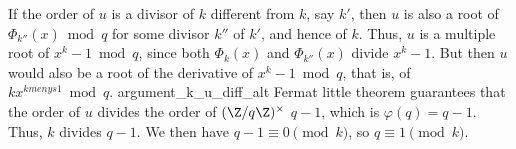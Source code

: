 If the order of ${u}$ is a divisor of ${k}$ different from ${k}$, say $k'$, then ${u}$ is also a root of $\Phi_{k''}(x) \bmod{q}$ for some divisor $k''$ of $k'$, and hence of ${k}$. Thus, ${u}$ is a multiple root of $x^{{k}}-1 \bmod{q}$, since both $\Phi_{{k}}(x)$ and $\Phi_{k''}(x)$ divide $x^{{k}}-1$. But then ${u}$ would also be a root of the derivative of $x^{{k}}-1 \bmod{q}$, that is, of ${k}x^{{kmenys1}}\bmod{q}$. {argument_k_u_diff_alt} Fermat little theorem guarantees that the order of ${u}$ divides the order of $(\Z/q\Z)^\times$ $q-1$, which is $\varphi(q)=q-1$. Thus, ${k}$ divides $q-1$. We then have $q-1\equiv 0\pmod{{k}}$, so $q\equiv 1\pmod{{k}}$.
